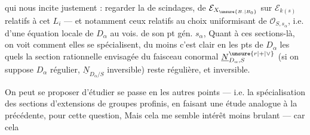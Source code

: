 qui nous incite justement : regarder la  de scindages, de $\mathcal E_{X_{\unsure{B.|B_0}}}$ sur $\mathcal E_{k(s)}$ relatifs à cet $L_i$ --- et notamment ceux relatifs au choix  uniformisant de $\mathcal O_{S,s_\alpha}$, i.e. d'une équation locale de $D_\alpha$ au vois. de son pt gén. $s_\alpha$,   Quant à ces sections-là, on voit comment elles se spécialisent, du moins c'est clair en les pts de $D_\alpha$  les quels la section rationnelle envisagée du faisceau conormal $\underline N_{D_\alpha,S}^{\unsure{r|+|\vee}}$ (si on suppose $D_\alpha$ régulier, \unsure{\deleted{)}|)|\&}   $\underline N_{D_\alpha/S}$ inversible) reste régulière, et inversible.

On peut se proposer d'étudier   se passe en les autres points --- i.e. la spécialisation des sections  d'extensions de groupes profinis, en faisant une étude analogue à la précédente, pour cette question, Mais cela me semble   intérêt moins brulant --- car cela 
